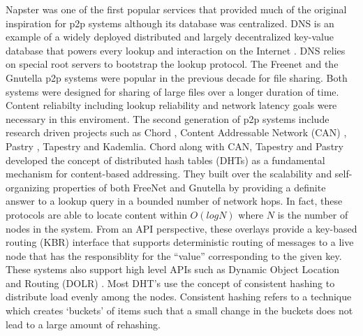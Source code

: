 Napster \cite{Napster} was one of the first popular services that provided much of the original inspiration for p2p
systems although its database was centralized.  DNS is an example of a widely deployed distributed and largely
decentralized key-value database that powers every lookup and interaction on the Internet \cite{Mockapetris_1988}. DNS
relies on special root servers to bootstrap the lookup protocol. The Freenet \cite{freenet_thesis, Clarke_2001} and the
Gnutella \cite{Gnutella} p2p systems were popular in the previous decade for file sharing. Both systems were designed
for sharing of large files over a longer duration of time. Content reliabilty including lookup reliability and network
latency goals were necessary in this enviroment. 
\newline\newline
The second generation of p2p systems include research driven projects such as Chord \cite{Stoica_2001}, Content
Addressable Network (CAN)
\cite{Ratnasamy_2001}, Pastry \cite{Rowstron_2001}, Tapestry \cite{tapestry2004} and
Kademlia. Chord along with CAN, Tapestry and Pastry developed the concept of distributed hash tables (DHTs) as a
fundamental mechanism for content-based addressing. They built over the scalability and self-organizing properties of
both FreeNet and Gnutella by providing a definite answer to a lookup query in a bounded number of network hops. In fact,
these protocols are able to locate content within \( O(log N) \) where \(N\) is the number of nodes in the system. From
an 
API perspective, these overlays provide a key-based routing (KBR) interface that supports deterministic routing of
messages to a live node that has the responsiblity for the ``value'' corresponding to the given key. These systems also
support high level APIs such as Dynamic Object Location and Routing (DOLR) \cite{dolr2003}. Most DHT's use the concept
of consistent hashing to distribute load evenly among the nodes. Consistent hashing refers to a technique which
creates `buckets' of items such that a small change in the buckets does not lead to a large amount of rehashing.
\newline\newline

